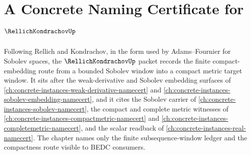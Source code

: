 \chapter{A Concrete Naming Certificate for $\RellichKondrachovUp$}
\label{ch:concrete-instances-rellich-kondrachov-namecert}

Following Rellich and Kondrachov, in the form used by Adams--Fournier for Sobolev spaces, the $\RellichKondrachovUp$ packet records the finite compact-embedding route from a bounded Sobolev window into a compact metric target window. It sits after the weak-derivative and Sobolev embedding surfaces of \autoref{ch:concrete-instances-weak-derivative-namecert} and \autoref{ch:concrete-instances-sobolev-embedding-namecert}, and it cites the Sobolev carrier of \autoref{ch:concrete-instances-sobolev-namecert}, the compact and complete metric witnesses of \autoref{ch:concrete-instances-compactmetric-namecert} and \autoref{ch:concrete-instances-completemetric-namecert}, and the scalar readback of \autoref{ch:concrete-instances-real-namecert}. The chapter names only the finite subsequence-window ledger and the compactness route visible to BEDC consumers.

